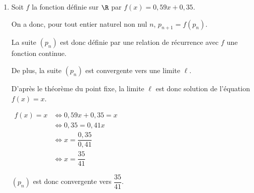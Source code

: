 \begin{enumerate}
	De plus, $p_n$ est égal une  probabilité donc $p_n \geqslant 0$, la suite $(p_{n})$ est donc minorée par 0. 
	
Donc la suite $(p_{n})$ est convergente vers une limite $\ell$. 
	
	\item   Soit $f$ la fonction définie sur $\R$ par $f(x) =0,59x+0,35$. 
	
	On a donc, pour tout entier naturel non nul  $n$, $p_{n+1}=f(p_n)$.
	
	La suite $(p_{n})$ est donc définie par une relation de récurrence  avec $f$  une fonction continue.
	
	De plus, la suite $(p_{n})$ est convergente vers une limite $\ell$.
	
	D'après le théorème du point fixe, la limite $\ell$ est donc solution de l'équation $f(x)=x$. 
	
	
	$\begin{aligned}  f(x)=x &\iff 0,59 x +0,35 = x \\
		&\iff 0,35 = 0,41x \\
	&	\iff x= \dfrac{0,35}{0,41}\\
	&\iff x = \dfrac{35}{41}
		\end{aligned}$
	
	
	$(p_n)$ est donc convergente vers  $\dfrac{35}{41}$. 
\end{enumerate}
